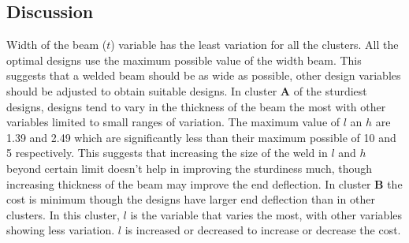 \subsection{Discussion}
Width of the beam ($t$) variable has the least variation for all the
clusters. All the optimal designs use the maximum possible value of the
width beam. This suggests that a welded beam should be as wide as possible,
other design variables should be adjusted to obtain suitable designs. In
cluster \textbf{A} of the sturdiest designs, designs tend to vary in the
thickness of the beam the most with other variables limited to small ranges
of variation. The maximum value of $l$ an $h$ are 1.39 and 2.49 which are
significantly less than their maximum possible of 10 and 5
respectively. This suggests that increasing the size of the weld in $l$ and
$h$ beyond certain limit doesn't help in improving the sturdiness much,
though increasing thickness of the beam may improve the end deflection. In
cluster \textbf{B} the cost is minimum though the designs have larger end
deflection than in other clusters. In this cluster, $l$ is the variable
that varies the most, with other variables showing less variation. $l$ is
increased or decreased to increase or decrease the cost.








 